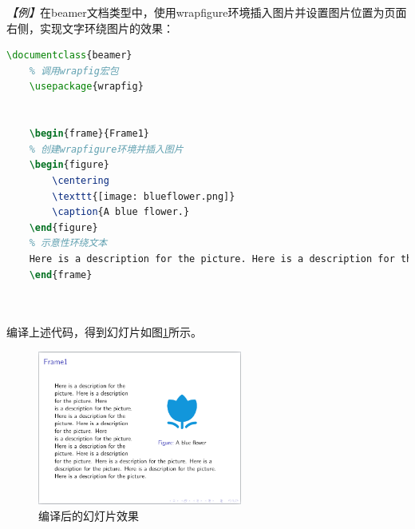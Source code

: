 \emph{【例】}在beamer文档类型中，使用wrapfigure环境插入图片并设置图片位置为页面右侧，实现文字环绕图片的效果：
\begin{lstlisting}[language=TeX]
    \documentclass{beamer}
    % 调用wrapfig宏包
    \usepackage{wrapfig}

    
    \begin{frame}{Frame1}
    % 创建wrapfigure环境并插入图片
    \begin{figure}
        \centering
        \texttt{[image: blueflower.png]}
        \caption{A blue flower.}
    \end{figure}
    % 示意性环绕文本
    Here is a description for the picture. Here is a description for the picture. Here is a description for the picture. Here is a description for the picture. Here is a description for the picture. Here is a description for the picture. Here is a description for the picture. Here is a description for the picture. Here is a description for the picture. Here is a description for the picture. Here is a description for the picture. Here is a description for the picture.
    \end{frame}

    
\end{lstlisting}

编译上述代码，得到幻灯片如图\ref{fig:947}所示。

\begin{figure}[htbp]
    \centering
    \includegraphics[width = 0.6\textwidth]{images/ch_9/eg6_7.png}
    \caption{编译后的幻灯片效果}
    \label{fig:947}
\end{figure}